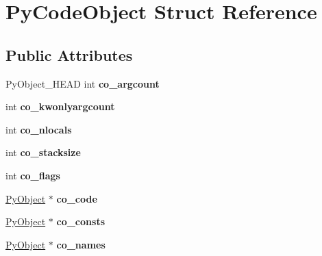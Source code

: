 \hypertarget{structPyCodeObject}{}\section{Py\+Code\+Object Struct Reference}
\label{structPyCodeObject}
\subsection*{Public Attributes}
\begin{DoxyCompactItemize}
\item 
Py\+Object\+\_\+\+H\+E\+AD int {\bfseries co\+\_\+argcount}\hypertarget{structPyCodeObject_adc0dadab6a4224c47cfccb332b2bd0b3}{}\label{structPyCodeObject_adc0dadab6a4224c47cfccb332b2bd0b3}

\item 
int {\bfseries co\+\_\+kwonlyargcount}\hypertarget{structPyCodeObject_a98955a4296f5c023291d467f81d50a1f}{}\label{structPyCodeObject_a98955a4296f5c023291d467f81d50a1f}

\item 
int {\bfseries co\+\_\+nlocals}\hypertarget{structPyCodeObject_a9365db6f0ac59f02a907b6bc41924f4c}{}\label{structPyCodeObject_a9365db6f0ac59f02a907b6bc41924f4c}

\item 
int {\bfseries co\+\_\+stacksize}\hypertarget{structPyCodeObject_ab171343772772be7a4911c28f96e415f}{}\label{structPyCodeObject_ab171343772772be7a4911c28f96e415f}

\item 
int {\bfseries co\+\_\+flags}\hypertarget{structPyCodeObject_a678b33effc331fb223622fd7aea8fac3}{}\label{structPyCodeObject_a678b33effc331fb223622fd7aea8fac3}

\item 
\hyperlink{struct__object}{Py\+Object} $\ast$ {\bfseries co\+\_\+code}\hypertarget{structPyCodeObject_a6f3c6ad3ccefda60ce7033c7375c17b0}{}\label{structPyCodeObject_a6f3c6ad3ccefda60ce7033c7375c17b0}

\item 
\hyperlink{struct__object}{Py\+Object} $\ast$ {\bfseries co\+\_\+consts}\hypertarget{structPyCodeObject_a4a19803042153ef763c58ab0980eb775}{}\label{structPyCodeObject_a4a19803042153ef763c58ab0980eb775}

\item 
\hyperlink{struct__object}{Py\+Object} $\ast$ {\bfseries co\+\_\+names}\hypertarget{structPyCodeObject_a830824fae12a5ef716896fa78a84adf2}{}\label{structPyCodeObject_a830824fae12a5ef716896fa78a84adf2}


\end{DoxyCompactItemize}
